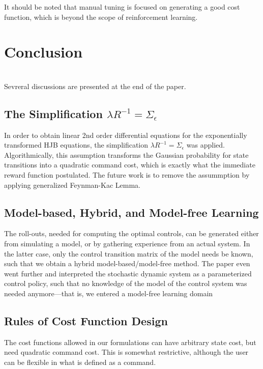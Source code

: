 \documentclass[journal]{IEEEtran}
\begin{document}
It should be noted that manual tuning is focused on generating a good cost function, which is beyond the scope of reinforcement learning. 


\section{Conclusion}
\ \\
Sevreral discussions are presented at the end of the paper.

\subsection{The Simplification $\lambda R^{-1} = \Sigma_{\epsilon}$}

In order to obtain linear 2nd order differential equations for the exponentially transformed HJB equations, the simplification $\lambda R^{-1} = \Sigma_{\epsilon}$ was applied.
Algorithmically, this assumption transforms the Gaussian probability for state transitions into a quadratic command cost, which is exactly what the immediate reward function postulated.
The future work is to remove the assummption by applying generalized Feynman-Kac Lemma.


\subsection{Model-based, Hybrid, and Model-free Learning}

The roll-outs, needed for computing the optimal controls, can be generated either from simulating a model, or by gathering experience from an actual system. In the latter case, 
only the control transition matrix of the model needs be known, such that we obtain a hybrid model-based/model-free method. The paper even went further and interpreted 
the stochastic dynamic system as a parameterized control policy, such that no knowledge of the model of the control system was needed anymore—that is, we entered a model-free learning domain



\subsection{Rules of Cost Function Design}


The cost functions allowed in our formulations can have arbitrary state cost, but need quadratic command cost. This is somewhat restrictive, although the user can be flexible in what is defined as a command.
\end{document}

